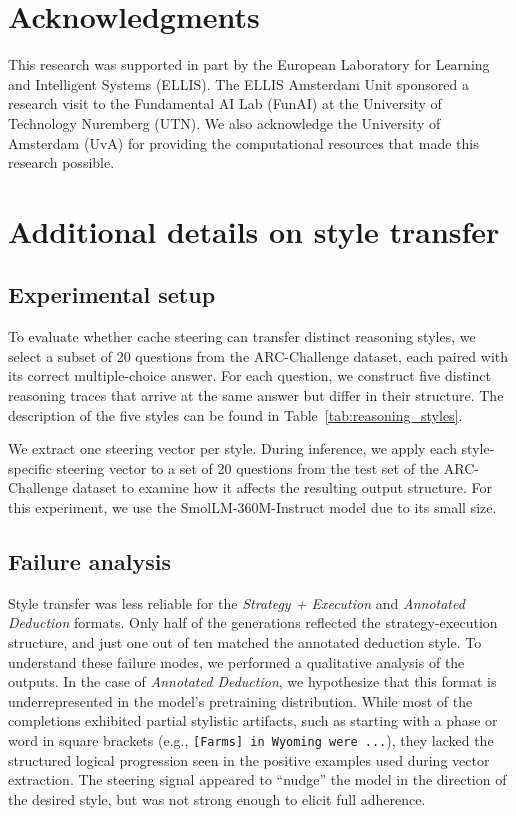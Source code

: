 \documentclass{article} %
\begin{document}
\section*{Acknowledgments}
This research was supported in part by the European Laboratory for Learning and Intelligent Systems (ELLIS). The ELLIS Amsterdam Unit sponsored a research visit to the Fundamental AI Lab (FunAI) at the University of Technology Nuremberg (UTN). We also acknowledge the University of Amsterdam (UvA) for providing the computational resources that made this research possible.





\appendix
\newpage

\section{Additional details on style transfer}
\label{appendix:style_transfer}

\subsection{Experimental setup}
To evaluate whether cache steering can transfer distinct reasoning styles, we select a subset of 20 questions from the ARC-Challenge dataset, each paired with its correct multiple-choice answer. For each question, we construct five distinct reasoning traces that arrive at the same answer but differ in their structure. The description of the five styles can be found in Table~\ref{tab:reasoning_styles}.

We extract one steering vector per style. During inference, we apply each style-specific steering vector to a set of 20 questions from the test set of the ARC-Challenge dataset to examine how it affects the resulting output structure. For this experiment, we use the SmolLM-360M-Instruct model due to its small size.




\subsection{Failure analysis}
Style transfer was less reliable for the \textit{Strategy + Execution} and \textit{Annotated Deduction} formats. Only half of the generations reflected the strategy-execution structure, and just one out of ten matched the annotated deduction style. To understand these failure modes, we performed a qualitative analysis of the outputs. In the case of \textit{Annotated Deduction}, we hypothesize that this format is underrepresented in the model’s pretraining distribution. While most of the completions exhibited partial stylistic artifacts, such as starting with a phase or word in square brackets (e.g., \texttt{[Farms] in Wyoming were ...}), they lacked the structured logical progression seen in the positive examples used during vector extraction. The steering signal appeared to “nudge” the model in the direction of the desired style, but was not strong enough to elicit full adherence.
\end{document}
